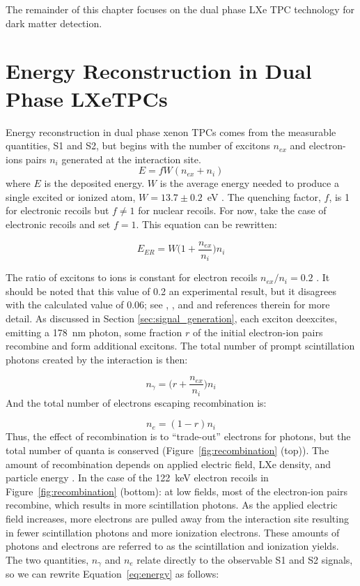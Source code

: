 The remainder of this chapter focuses on the dual phase \ac{LXe} \ac{TPC} technology for dark matter detection. 

\FloatBarrier
\section{Energy Reconstruction in Dual Phase LXeTPCs}
\label{sec:energy_reconstruction}
Energy reconstruction in dual phase xenon \ac{TPC}s comes from the measurable quantities, S1 and S2, but begins with the number of excitons $n_{ex}$  and electron-ions pairs $n_{i}$ generated at the interaction site. 
\begin{equation}
E = f W (n_{ex} + n_{i} )
\end{equation}
where $E$ is the deposited energy. $W$ is the average energy needed to produce a single excited or ionized atom, $W = 13.7 \pm 0.2$~eV \cite{Mock2014}. The quenching factor, $f$, is 1 for electronic recoils but $f \neq 1$ for nuclear recoils. For now, take the case of electronic recoils and set $f=1$. This equation can be rewritten:

\begin{equation}
E_{ER} = W \Big(1 + \frac{n_{ex}}{n_{i}} \Big) n_{i}
\end{equation}

The ratio of excitons to ions is constant for electron recoils $n_{ex}/n_{i} = 0.2$ \cite{LUX:YieldsAndRecombination}. It should be noted that this value of 0.2 an experimental result, but it disagrees with the calculated value of 0.06; see \cite{Doke2002}, \cite{Aprile2007}, and \cite{LUXTritium} and references therein for more detail.  As discussed in Section \ref{sec:signal_generation}, each exciton deexcites, emitting a 178~nm photon, some fraction $r$ of the initial electron-ion pairs recombine and form additional excitons. The total number of prompt scintillation photons created by the interaction is then:

\begin{equation}
n_{\gamma} = \Big(r + \frac{n_{ex}}{n_{i}} \Big) n_{i}
\end{equation}
And the total number of electrons escaping recombination is:

\begin{equation}
n_{e} = (1 - r ) n_{i}
\end{equation}
Thus, the effect of recombination is to ``trade-out'' electrons for photons, but the total number of quanta is conserved (Figure~\ref{fig:recombination} (top)). The amount of recombination depends on applied electric field, \ac{LXe} density, and particle energy \cite{LUX:YieldsAndRecombination}. In the case of the 122~keV electron recoils in Figure~\ref{fig:recombination} (bottom): at low fields, most of the electron-ion pairs recombine, which results in more scintillation photons. As the applied electric field increases, more electrons are pulled away from the interaction site resulting in fewer scintillation photons and more ionization electrons. These amounts of photons and electrons are referred to as the scintillation and ionization yields. The two quantities, $n_{\gamma}$  and $n_{e}$ relate directly to the observable S1 and S2 signals, so we can rewrite Equation~\ref{eq:energy} as follows:

